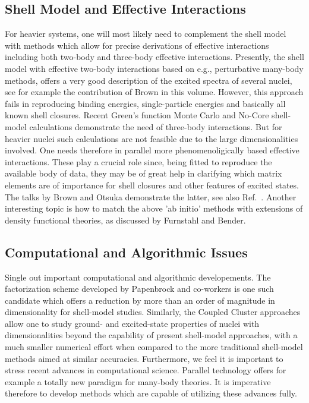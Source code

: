\documentclass[12pt]{iopart}
\begin{document}
\subsection{Shell Model and Effective Interactions} 

For heavier systems, one will most likely need to 
complement the shell model with methods which allow for precise derivations of effective
interactions including both two-body and three-body effective interactions.
Presently, the  shell model with effective two-body interactions based on e.g., 
perturbative many-body methods,
offers a very good description of the excited spectra of several nuclei, see for example
the contribution of Brown in this volume.
However, this approach fails in reproducing 
binding energies, single-particle energies and basically  
all known shell closures. Recent Green's function Monte Carlo and No-Core shell-model 
calculations demonstrate the need of three-body interactions.  But for heavier nuclei
such calculations are not feasible due to the large dimensionalities involved.
One needs therefore 
in parallel more phenomenoligically based effective interactions. These 
play a crucial role
since, being fitted to reproduce the available body of data, 
they may be of great help in clarifying
which matrix elements are of importance for shell closures and other features of 
excited states.   The talks by Brown and Otsuka demonstrate the latter, 
see also Ref.~\cite{taka}. 
Another interesting topic is how to match the above 'ab initio' methods with extensions
of density functional theories, as discussed by Furnstahl and Bender.

\subsection{Computational and Algorithmic Issues}

Single out important computational and algorithmic developements. The 
factorization scheme developed by Papenbrock and co-workers is one such 
candidate
which offers a reduction by more than an order of magnitude in dimensionality 
for shell-model studies. Similarly, the Coupled Cluster approaches
allow one to study ground- and excited-state properties of nuclei
with dimensionalities beyond the capability of present shell-model
approaches, with a much smaller numerical effort when compared to
the more traditional shell-model methods aimed at similar accuracies.
Furthermore, we feel it is important to stress recent advances in computational
science.
Parallel technology offers for example a totally new paradigm
for many-body theories. It is imperative therefore to develop methods which are capable
of utilizing these advances fully.  
\end{document}
